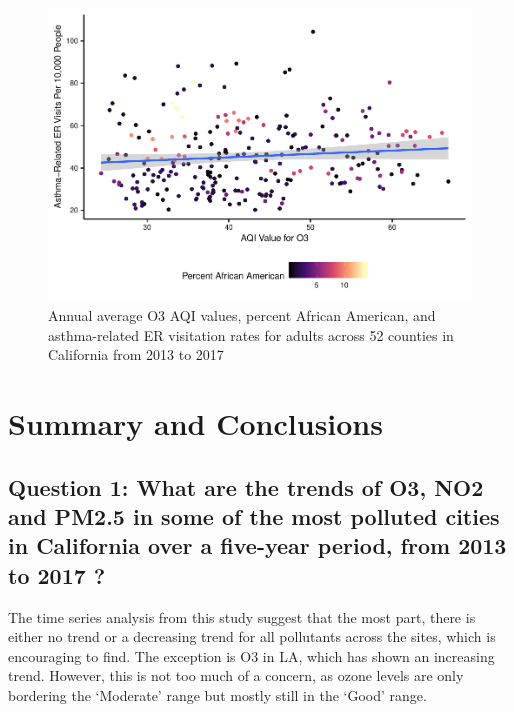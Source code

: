 \documentclass[12pt,]{article}
\begin{document}
\begin{figure}
\centering
\includegraphics{FinalProject_AliciaZhao_files/figure-latex/unnamed-chunk-25-1.pdf}
\caption{Annual average O3 AQI values, percent African American, and
asthma-related ER visitation rates for adults across 52 counties in
California from 2013 to 2017}
\end{figure}

\newpage

\hypertarget{summary-and-conclusions}{%
\section{Summary and Conclusions}\label{summary-and-conclusions}}

\hypertarget{question-1-what-are-the-trends-of-o3-no2-and-pm2.5-in-some-of-the-most-polluted-cities-in-california-over-a-five-year-period-from-2013-to-2017}{%
\subsection{\texorpdfstring{\textbf{Question 1:} What are the trends of
O3, NO2 and PM2.5 in some of the most polluted cities in California over
a five-year period, from 2013 to 2017
?}{Question 1: What are the trends of O3, NO2 and PM2.5 in some of the most polluted cities in California over a five-year period, from 2013 to 2017 ?}}\label{question-1-what-are-the-trends-of-o3-no2-and-pm2.5-in-some-of-the-most-polluted-cities-in-california-over-a-five-year-period-from-2013-to-2017}}

The time series analysis from this study suggest that the most part,
there is either no trend or a decreasing trend for all pollutants across
the sites, which is encouraging to find. The exception is O3 in LA,
which has shown an increasing trend. However, this is not too much of a
concern, as ozone levels are only bordering the `Moderate' range but
mostly still in the `Good' range.
\end{document}
